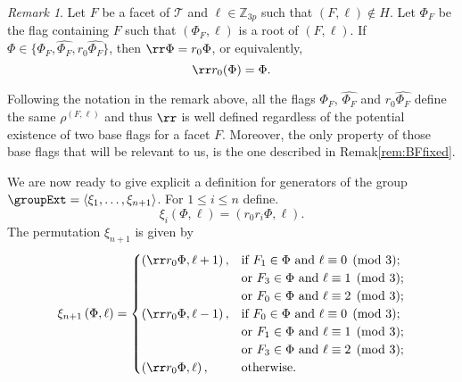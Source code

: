 \documentclass[final]{amsart}
\theoremstyle{plain}
\theoremstyle{definition}
\theoremstyle{remark}
\newtheorem{rem}[thm]{Remark}
\numberwithin{equation}{section}
\renewcommand{\leq}{\leqslant} \renewcommand{\geq}{\geqslant}
\renewcommand{\{}{\lbrace}
\renewcommand{\}}{\rbrace}
\renewcommand{\hat}{\widehat}
\newcommand{\bZ}{\mathbb{Z}}
\newcommand{\cT}{\mathcal{T}}
\newcommand{\te}{\xi}
\begin{document}
\begin{rem}\label{rem:BFfixed_}
   Let $F$ be a facet of $\cT$ and $\ell \in \bZ_{3p} $ such that $(F,\ell) \not\in H$.
   Let $\Phi_{F}$ be the flag containing $F$ such that $(\Phi_{F}, \ell)$ is a root of $(F,\ell)$.
   If $\Phi \in \{\Phi_{F}, \hat{\Phi_F}, r_{0} \hat{\Phi_F}  \}$, then $\rr\Phi = r_{0}\Phi$, or equivalently,
   \begin{equation}\label{eq:BFfixed}
   \rr r_{0} (\Phi) = \Phi.
   \end{equation}
 \end{rem}

 Following the notation in the remark above, all the flags $\Phi_{F}$, $ \hat{\Phi_{F}}$ and $r_{0} \hat{\Phi_{F}}$ define the same $\rho^{(F,\ell)}$ and thus $\rr$ is well defined regardless of the potential existence of two base flags for a facet $F$.
 Moreover, the only property of those base flags that will be relevant to us, is the one described in Remak\nobreakspace \ref {rem:BFfixed}.


We are now ready to give explicit  a definition for generators of the group $\groupExt = \langle \te_1, \dots, \te_{n+1} \rangle$. For $ 1\leq i \leq n$ define.
\begin{equation} \label{eq:smallGens}
\te_{i} \left(\Phi, \ell \right) = \left(r_{0}r_{i}\Phi,\ell \right).
\end{equation}The permutation $\te_{n+1}$ is given by 
\begin{equation}\label{eq:lastGen}
\te_{n+1} \left(\Phi, \ell \right) =
  \begin{cases}
	  \left(\rr r_{0}\Phi,\ell+1 \right), 
            &\text{if } F_{1} \in \Phi\text{ and } \ell \equiv 0 \pmod{3};\\ 
            &\text{or } F_{3} \in \Phi \text{ and } \ell \equiv 1 \pmod{3}; \\
            &\text{or } F_{0} \in \Phi \text{ and } \ell \equiv 2 \pmod{3}; \\
	  \left(\rr r_{0}\Phi,\ell-1 \right), 
            &\text{if } F_{0} \in \Phi\text{ and } \ell \equiv 0 \pmod{3};\\ 
            &\text{or } F_{1} \in \Phi \text{ and } \ell \equiv 1 \pmod{3}; \\
            &\text{or } F_{3} \in \Phi \text{ and } \ell \equiv 2 \pmod{3}; \\
	  \left(\rr r_{0}\Phi,\ell \right), &\text{otherwise.}
 \end{cases}
\end{equation}
\end{document}
